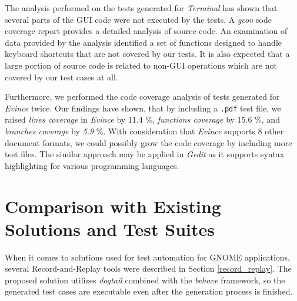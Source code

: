 The analysis performed on the tests generated for \textit{Terminal} has shown that several parts of the GUI code were not executed by the tests. A \textit{gcov} code coverage report provides a detailed analysis of source code. An examination of data provided by the analysis identified a set of functions designed to handle keyboard shortcuts that are not covered by our tests. It is also expected that a large portion of source code is related to non-GUI operations which are not covered by our test cases at all.

Furthermore, we performed the code coverage analysis of tests generated for \textit{Evince} twice. Our findings have shown, that by including a \texttt {.pdf} test file, we raised \textit{lines coverage} in \textit{Evince} by 11.4 \%, \textit{functions coverage} by 15.6 \%, and \textit{branches coverage} by \textit{5.9} \%.  With consideration that \textit{Evince} supports 8 other document formats, we could possibly grow the code coverage by including more test files. The similar approach may be applied in \textit{Gedit} as it supports syntax highlighting for various programming languages.

\section{Comparison with Existing Solutions and Test Suites}\label{comparison_with_existing_tools}
When it comes to solutions used for test automation for GNOME applications, several Record-and-Replay tools were described in Section \ref{record_replay}. The proposed solution utilizes \textit{dogtail} combined with the \textit{behave} framework, so the generated test cases are executable even after the generation process is finished.

